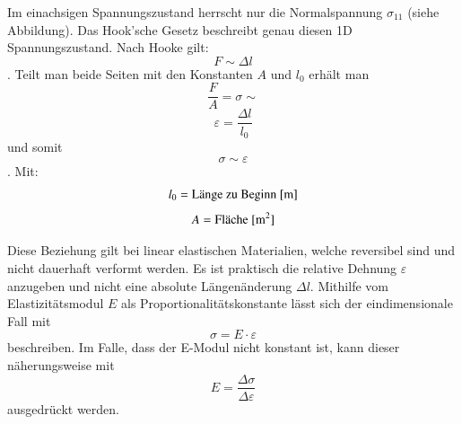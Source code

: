 Im einachsigen Spannungszustand herrscht nur die Normalspannung $\sigma_{11}$ (siehe Abbildung).
Das Hook'sche Gesetz beschreibt genau diesen 1D Spannungszustand.
Nach Hooke gilt:
\[
F
\sim
\Delta l
\]
.
Teilt man beide Seiten mit den Konstanten $A$ und $l_0$ erhält man
\[
\frac{F}{A}
=
\sigma
\sim
\]
\[
\varepsilon
=
\frac{\Delta l}{l_0}
\]
und somit
\[
\sigma
\sim
\varepsilon
\]
.
Mit:
\[
l_0
=
\text{Länge zu Beginn [\si{\meter}]}
\]
\[
A
=
\text{Fläche [\si{\meter\squared}]}
\]

Diese Beziehung gilt bei linear elastischen Materialien, welche reversibel sind und nicht dauerhaft verformt werden.
Es ist praktisch die relative Dehnung $\varepsilon$ anzugeben und nicht eine absolute Längenänderung $\Delta l$.
Mithilfe vom Elastizitätsmodul $E$ als Proportionalitätskonstante lässt sich der eindimensionale Fall mit
\[
\sigma
=
E\cdot\varepsilon
\]
beschreiben.
Im Falle, dass der E-Modul nicht konstant ist, kann dieser näherungsweise mit
\[
E
=
\frac{\Delta\sigma}{\Delta\varepsilon}
\]
ausgedrückt werden.